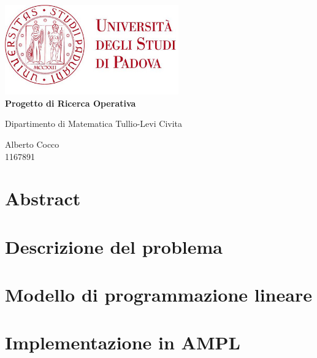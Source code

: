 \documentclass{article}
\begin{document}
\begin{titlepage}
	\begin{center}
		\includegraphics[width=7.5cm]{components/logo.jpg}\\
    	\huge
    	\textbf{Progetto di Ricerca Operativa }

    	\vspace{1cm}

    	\Large{Dipartimento di Matematica Tullio-Levi Civita}

    	\vspace{10cm}
    	\normalsize{Alberto Cocco}\\
    	\normalsize{1167891}
    	\end{center}
\end{titlepage}

	\tableofcontents
	\newpage

\section{Abstract}%
\label{sec:abstract}



\section{Descrizione del problema}%
\label{sec:descrizione_del_problema}



\section{Modello di programmazione lineare}%
\label{sec:modello_di_programmazione_lineare}



\section{Implementazione in AMPL}%
\label{sec:implementazione_in_AMPL}


\end{document}
